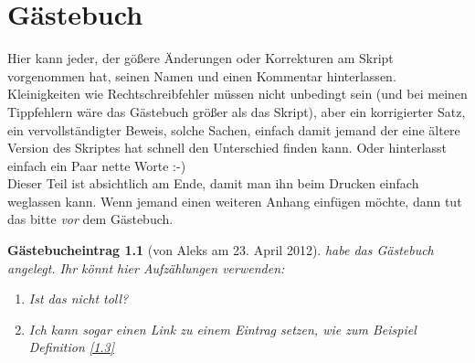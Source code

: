 \documentclass[a4paper,12pt]{report}
\theoremstyle{break}
\theoremstyle{nonumberbreak}
\newtheorem{gast}{G\"astebucheintrag}
\theoremstyle{nonumberplain}
\begin{document}
\begin{Aufg}

\end{Aufg}

\chapter{G\"astebuch}
Hier kann jeder, der g\"o\ss ere \"Anderungen oder Korrekturen am Skript vorgenommen hat, seinen Namen und einen Kommentar hinterlassen. Kleinigkeiten wie Rechtschreibfehler m\"ussen nicht unbedingt sein (und bei meinen Tippfehlern w\"are das G\"astebuch gr\"o\ss er als das Skript), aber ein korrigierter Satz, ein vervollst\"andigter Beweis, solche Sachen, einfach damit jemand der eine \"altere Version des Skriptes hat schnell den Unterschied finden kann. Oder hinterlasst einfach ein Paar nette Worte :-)\\
Dieser Teil ist absichtlich am Ende, damit man ihn beim Drucken einfach weglassen kann. Wenn jemand einen weiteren Anhang einf\"ugen m\"ochte, dann tut das bitte \emph{vor} dem G\"astebuch.

\begin{gast}[von Aleks am 23. April 2012]
habe das G\"astebuch angelegt. Ihr k\"onnt hier Aufz\"ahlungen verwenden:
\begin{enumerate}[1)]
\item
	Ist das nicht toll?
\item
	Ich kann sogar einen Link zu einem Eintrag setzen, wie zum Beispiel Definition \ref{1.3}
\end{enumerate}
\end{gast}
\end{document}

